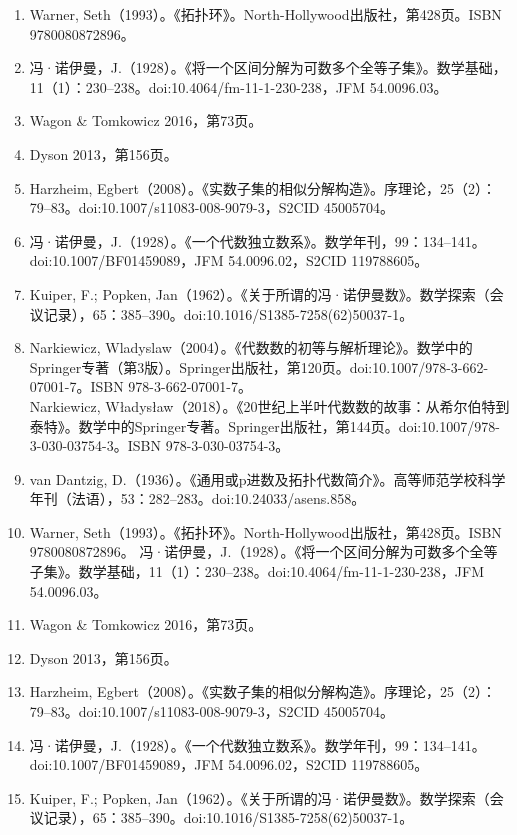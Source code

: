 \begin{enumerate}
\item Warner, Seth（1993）。《拓扑环》。North-Hollywood出版社，第428页。ISBN 9780080872896。  
\item 冯·诺伊曼，J.（1928）。《将一个区间分解为可数多个全等子集》。数学基础，11（1）：230–238。doi:10.4064/fm-11-1-230-238，JFM 54.0096.03。  
\item Wagon & Tomkowicz 2016，第73页。  
\item Dyson 2013，第156页。  
\item Harzheim, Egbert（2008）。《实数子集的相似分解构造》。序理论，25（2）：79–83。doi:10.1007/s11083-008-9079-3，S2CID 45005704。  
\item 冯·诺伊曼，J.（1928）。《一个代数独立数系》。数学年刊，99：134–141。doi:10.1007/BF01459089，JFM 54.0096.02，S2CID 119788605。  
\item Kuiper, F.; Popken, Jan（1962）。《关于所谓的冯·诺伊曼数》。数学探索（会议记录），65：385–390。doi:10.1016/S1385-7258(62)50037-1。
\item Narkiewicz, Wladyslaw（2004）。《代数数的初等与解析理论》。数学中的Springer专著（第3版）。Springer出版社，第120页。doi:10.1007/978-3-662-07001-7。ISBN 978-3-662-07001-7。\\  
Narkiewicz, Władysław（2018）。《20世纪上半叶代数数的故事：从希尔伯特到泰特》。数学中的Springer专著。Springer出版社，第144页。doi:10.1007/978-3-030-03754-3。ISBN 978-3-030-03754-3。\\  
\item van Dantzig, D.（1936）。《通用或p进数及拓扑代数简介》。高等师范学校科学年刊（法语），53：282–283。doi:10.24033/asens.858。  
\item Warner, Seth（1993）。《拓扑环》。North-Hollywood出版社，第428页。ISBN 9780080872896。  
冯·诺伊曼，J.（1928）。《将一个区间分解为可数多个全等子集》。数学基础，11（1）：230–238。doi:10.4064/fm-11-1-230-238，JFM 54.0096.03。  
\item Wagon & Tomkowicz 2016，第73页。  
\item Dyson 2013，第156页。  
\item Harzheim, Egbert（2008）。《实数子集的相似分解构造》。序理论，25（2）：79–83。doi:10.1007/s11083-008-9079-3，S2CID 45005704。  
\item 冯·诺伊曼，J.（1928）。《一个代数独立数系》。数学年刊，99：134–141。doi:10.1007/BF01459089，JFM 54.0096.02，S2CID 119788605。  
\item Kuiper, F.; Popken, Jan（1962）。《关于所谓的冯·诺伊曼数》。数学探索（会议记录），65：385–390。doi:10.1016/S1385-7258(62)50037-1。

\end{enumerate}